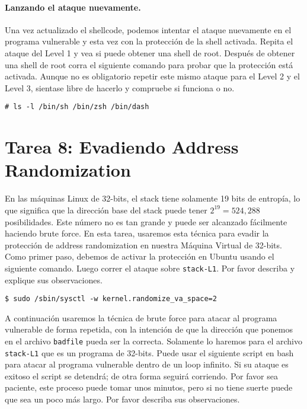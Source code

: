 \paragraph{Lanzando el ataque nuevamente.}
Una vez actualizado el shellcode, podemos intentar el ataque nuevamente en el programa vulnerable y esta vez con la protección de la shell activada. Repita el ataque del Level 1 y vea si puede obtener una shell de root. Después de obtener una shell de root corra el siguiente comando para probar que la protección está activada. Aunque no es obligatorio repetir este mismo ataque para el Level 2 y el Level 3, sientase libre de hacerlo y compruebe si funciona o no.

\begin{lstlisting}
# ls -l /bin/sh /bin/zsh /bin/dash
\end{lstlisting}
 


\section{Tarea 8: Evadiendo Address Randomization}

En las máquinas Linux de 32-bits, el stack tiene solamente 19 bits de entropía, lo que significa que la dirección base del stack puede tener  $2^{19} = 524,288$ posibilidades. Este número no es tan grande y puede ser alcanzado fácilmente haciendo brute force. En esta tarea, usaremos esta técnica para evadir la protección de address randomization en nuestra Máquina Virtual de 32-bits.
Como primer paso, debemos de activar la protección en Ubuntu usando el siguiente comando. Luego correr el ataque sobre \texttt{stack-L1}.
Por favor describa y explique sus observaciones.

\begin{lstlisting}
$ sudo /sbin/sysctl -w kernel.randomize_va_space=2
\end{lstlisting}

A continuación usaremos la técnica de brute force para atacar al programa vulnerable de forma repetida, con la intención de que la dirección que ponemos en el archivo  \texttt{badfile} pueda ser la correcta. Solamente lo haremos para el archivo \texttt{stack-L1} que es un programa de 32-bits.
Puede usar el siguiente script en bash para atacar al programa vulnerable dentro de un loop infinito. Si su ataque es exitoso el script se detendrá; de otra forma seguirá corriendo. Por favor sea paciente, este proceso puede tomar unos minutos, pero si no tiene suerte puede que sea un poco más largo. Por favor describa sus observaciones.


